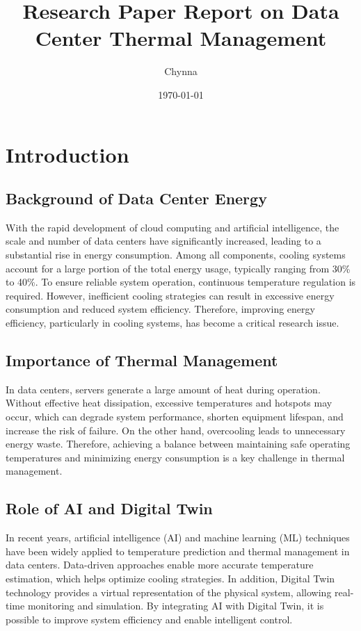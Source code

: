 \documentclass[12pt,a4paper]{article}
\title{Research Paper Report on Data Center Thermal Management}
\author{Chynna}
\date{\today}
\begin{document}
\maketitle
\tableofcontents
\newpage

\section{ Introduction}

\subsection{Background of Data Center Energy}%
With the rapid development of cloud computing and artificial intelligence, the scale and number of data centers have significantly increased, leading to a substantial rise in energy consumption. Among all components, cooling systems account for a large portion of the total energy usage, typically ranging from 30\% to 40\%. To ensure reliable system operation, continuous temperature regulation is required. However, inefficient cooling strategies can result in excessive energy consumption and reduced system efficiency. Therefore, improving energy efficiency, particularly in cooling systems, has become a critical research issue.

\subsection{Importance of Thermal Management}%
In data centers, servers generate a large amount of heat during operation. Without effective heat dissipation, excessive temperatures and hotspots may occur, which can degrade system performance, shorten equipment lifespan, and increase the risk of failure. On the other hand, overcooling leads to unnecessary energy waste. Therefore, achieving a balance between maintaining safe operating temperatures and minimizing energy consumption is a key challenge in thermal management.

\subsection{Role of AI and Digital Twin}%
In recent years, artificial intelligence (AI) and machine learning (ML) techniques have been widely applied to temperature prediction and thermal management in data centers. Data-driven approaches enable more accurate temperature estimation, which helps optimize cooling strategies. In addition, Digital Twin technology provides a virtual representation of the physical system, allowing real-time monitoring and simulation. By integrating AI with Digital Twin, it is possible to improve system efficiency and enable intelligent control.
\end{document}
